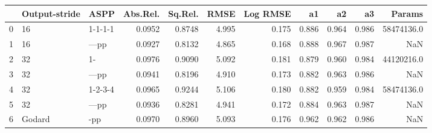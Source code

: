 \begin{tabular}{lllrrrrrrrr}
\toprule
{} & Output-stride &     ASPP &  Abs.Rel. &  Sq.Rel. &   RMSE &  Log RMSE &     a1 &     a2 &     a3 &      Params \\
\midrule
0 &            16 &  1-1-1-1 &    0.0952 &   0.8748 &  4.995 &     0.175 &  0.886 &  0.964 &  0.986 &  58474136.0 \\
1 &            16 &    ---pp &    0.0927 &   0.8132 &  4.865 &     0.168 &  0.888 &  0.967 &  0.987 &         NaN \\
2 &            32 &       1- &    0.0976 &   0.9090 &  5.092 &     0.181 &  0.879 &  0.960 &  0.984 &  44120216.0 \\
3 &            32 &    ---pp &    0.0941 &   0.8196 &  4.910 &     0.173 &  0.882 &  0.963 &  0.986 &         NaN \\
4 &            32 &  1-2-3-4 &    0.0965 &   0.9244 &  5.106 &     0.180 &  0.882 &  0.959 &  0.984 &  58474136.0 \\
5 &            32 &    ---pp &    0.0936 &   0.8281 &  4.941 &     0.172 &  0.884 &  0.963 &  0.987 &         NaN \\
6 &        Godard &      -pp &    0.0970 &   0.8960 &  5.093 &     0.176 &  0.962 &  0.962 &  0.986 &         NaN \\
\bottomrule
\end{tabular}
